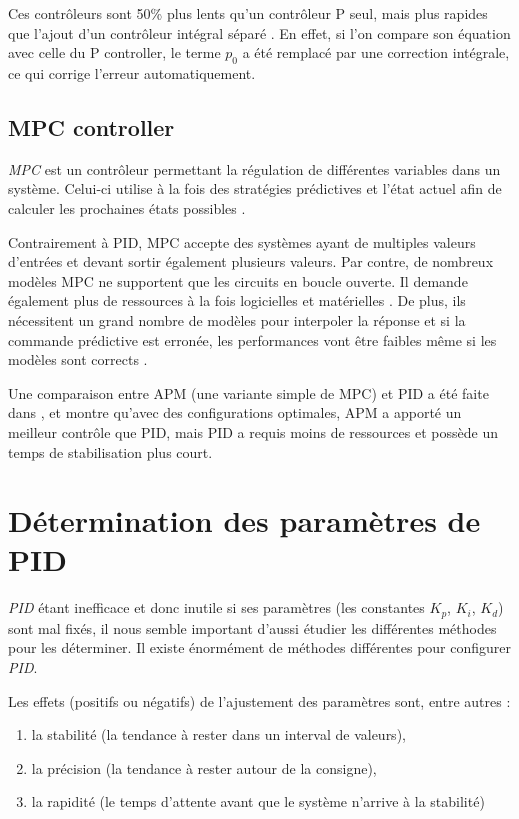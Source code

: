 \documentclass[a4paper,10pt]{report}
\begin{document}
Ces contrôleurs sont 50\% plus lents qu'un contrôleur P seul, mais plus rapides que l'ajout d'un contrôleur intégral séparé \cite{svrcek2014real}.
En effet, si l'on compare son équation avec celle du P controller, le terme $p_0$ a été remplacé par une correction intégrale, ce qui corrige l'erreur automatiquement.

\subsection{MPC controller}
\emph{MPC} est un contrôleur permettant la régulation de différentes variables dans un système.
Celui-ci utilise à la fois des stratégies prédictives et l'état actuel afin de calculer les prochaines états possibles \cite{RICHALET1978413}.

Contrairement à PID, MPC accepte des systèmes ayant de multiples valeurs d'entrées et devant sortir également plusieurs valeurs.
Par contre, de nombreux modèles MPC ne supportent que les circuits en boucle ouverte.
Il demande également plus de ressources à la fois logicielles et matérielles \cite{saletovic2014apm}.
De plus, ils nécessitent un grand nombre de modèles pour interpoler la réponse et si la commande prédictive est erronée, les performances vont être faibles même si les modèles sont corrects \cite{Richalet2016}.

Une comparaison entre APM (une variante simple de MPC) et PID a été faite dans \cite{saletovic2014apm}, et montre qu'avec des configurations optimales, APM a apporté un meilleur contrôle que PID, mais PID a requis moins de ressources et possède un temps de stabilisation plus court.

\section{Détermination des paramètres de PID}

\emph{PID} étant inefficace et donc inutile si ses paramètres (les constantes $K_p$, $K_i$, $K_d$) sont mal fixés, il nous semble important d'aussi étudier les différentes méthodes pour les déterminer. Il existe énormément de méthodes différentes pour configurer \emph{PID}.

Les effets (positifs ou négatifs) de l'ajustement des paramètres sont, entre autres \cite{zhong2006pid} :
\begin{enumerate}
\item la stabilité (la tendance à rester dans un interval de valeurs),
\item la précision (la tendance à rester autour de la consigne),
\item la rapidité (le temps d'attente avant que le système n'arrive à la stabilité)
\end{enumerate}
\end{document}
